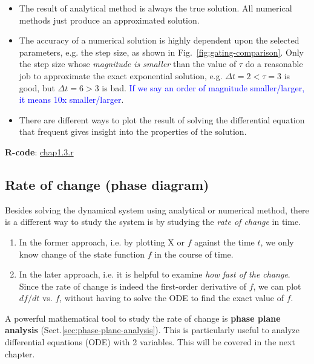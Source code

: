 \begin{itemize}
\item The result of analytical method is always the true solution. All
  numerical methods just produce an approximated solution.

\item The accuracy of a numerical solution is highly dependent upon
  the selected parameters, e.g. the step size, as shown in
  Fig.~\ref{fig:gating-comparison}.  Only the step size whose
  {\it magnitude is smaller} than the value of $\tau$ do a reasonable
  job to approximate the exact exponential solution, e.g. $\Delta t =
  2 < \tau = 3$ is good, but $\Delta t = 6 > 3$ is
  bad.
  \textcolor{blue}{If we say an order of magnitude smaller/larger, it
    means 10x smaller/larger}.

\item There are different ways to plot the result of solving the
  differential equation that frequent gives insight into the
  properties of the solution.
\end{itemize}

{\bf R-code}: \hyperref[chap1.3.r]{chap1.3.r}

\subsection{Rate of change (phase diagram)}
\label{sec:analysis-rate-change}
\label{sec:rate-of-change-example}

Besides solving the dynamical system using analytical or numerical method, there
is a different way to study the system is by studying the {\it rate of change}
in time. 
\begin{enumerate}
  \item In the former approach, i.e. by plotting X or $f$ against the time $t$, we only
know change of the state function $f$ in the course of time.

  \item In the later approach, i.e. it is helpful to examine {\it how fast of
  the change}. Since the rate of change is indeed the first-order derivative of $f$,
we can plot $df/dt$ vs. $f$, without having to solve the ODE to find the exact
value of $f$.
\end{enumerate}

\begin{framed}

  A powerful mathematical tool to study the rate of change is {\bf phase plane
  analysis} (Sect.\ref{sec:phase-plane-analysis}).  This is particularly useful
  to analyze differential equations (ODE) with 2 variables. This will be covered
  in the next chapter.
\end{framed}

